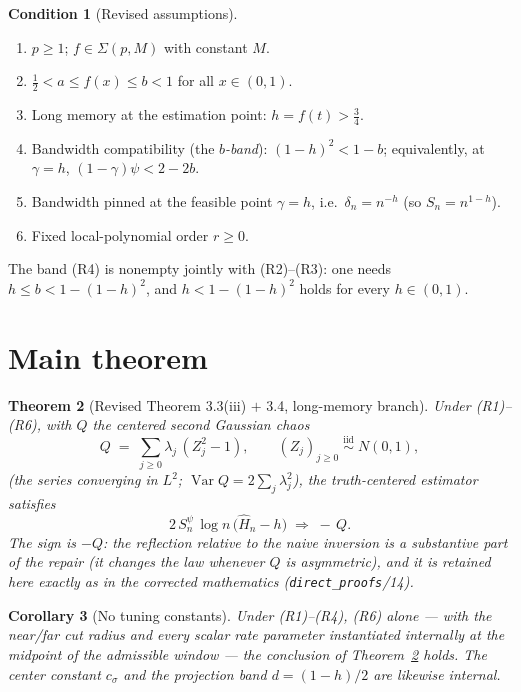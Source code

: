 \documentclass[11pt]{article}
\newtheorem{theorem}{Theorem}
\newtheorem{corollary}[theorem]{Corollary}
\theoremstyle{definition}
\newtheorem{condition}[theorem]{Condition}
\theoremstyle{remark}
\begin{document}
\begin{condition}[Revised assumptions]\label{cond:main}\ \\
\begin{enumerate}
\item[(R1)] $p \ge 1$; $f \in \Sigma(p,M)$ with constant $M$.
\item[(R2)] $\tfrac12 < a \le f(x) \le b < 1$ for all $x \in (0,1)$.
\item[(R3)] Long memory at the estimation point: $h = f(t) > \tfrac34$.
\item[(R4)] Bandwidth compatibility (the \emph{$b$-band}):
      $(1-h)^2 < 1 - b$; equivalently, at $\gamma = h$,
      $(1-\gamma)\psi < 2-2b$.
\item[(R5)] Bandwidth pinned at the feasible point $\gamma = h$,
      i.e.\ $\delta_n = n^{-h}$ (so $S_n = n^{1-h}$).
\item[(R6)] Fixed local-polynomial order $r \ge 0$.
\end{enumerate}
\end{condition}

\noindent The band (R4) is nonempty jointly with (R2)--(R3): one needs
$h \le b < 1-(1-h)^2$, and $h < 1-(1-h)^2$ holds for every $h\in(0,1)$.

\section{Main theorem}

\begin{theorem}[Revised Theorem 3.3(iii) $+$ 3.4, long-memory branch]\label{thm:main}
Under \textup{(R1)}--\textup{(R6)}, with $Q$ the centered second Gaussian chaos
\[
Q \;=\; \sum_{j\ge0} \lambda_j\,(Z_j^2 - 1), \qquad (Z_j)_{j\ge0}
\;\overset{\text{iid}}{\sim}\; N(0,1),
\]
(the series converging in $L^2$; $\operatorname{Var} Q = 2\sum_j \lambda_j^2$),
the truth-centered estimator satisfies
\[
\boxed{\;\; 2\,S_n^{\psi}\,\log n\,\bigl(\widehat H_n - h\bigr)
\;\Longrightarrow\; -\,Q . \;\;}
\]
The sign is $-Q$: the reflection relative to the naive inversion is a
substantive part of the repair (it changes the law whenever $Q$ is asymmetric),
and it is retained here exactly as in the corrected mathematics
(\texttt{direct\_proofs}/14).
\end{theorem}

\begin{corollary}[No tuning constants]\label{cor:zero}
Under (R1)--(R4), (R6) alone — with the near/far cut radius and every scalar
rate parameter instantiated internally at the midpoint of the admissible window
— the conclusion of Theorem~\ref{thm:main} holds. The center constant
$c_\sigma$ and the projection band $d = (1-h)/2$ are likewise internal.
\end{corollary}
\end{document}
